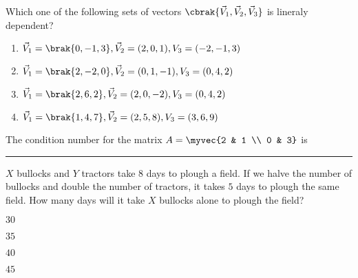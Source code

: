     \item Which one of the following sets of vectors $\cbrak{\vec{V}_1,\vec{V}_2,\vec{V}_3}$ is lineraly dependent?
                \begin{enumerate}
                        \item $\vec{V}_1 = \brak{0,-1,3}, \vec{V}_2 = (2,0,1), V_3 =(-2,-1,3)$
                        \item $\vec{V}_1 = \brak{2,-2,0}, \vec{V}_2 = (0,1,-1), V_3 =(0,4,2)$
                        \item $\vec{V}_1 = \brak{2,6,2}, \vec{V}_2 = (2,0,-2), V_3 =(0,4,2)$
                        \item $\vec{V}_1 = \brak{1,4,7}, \vec{V}_2 = (2,5,8), V_3 =(3,6,9)$
                \end{enumerate}
	    \hfill{}
    
    \item The condition number for the matrix $A = \myvec{2 & 1 \\ 0 & 3}$ is \rule{3cm}{0.15mm}  \hfill{}
    
                
    \item $X$ bullocks and $Y$ tractors take $8$ days to plough a field. If we halve the number of bullocks and double the number of tractors, it takes $5$ days to plough the same field. How many days will it take $X$ bullocks alone to plough the field? \hfill{}
        \begin{enumerate}
            \begin{multicols}{4}
                \item $30$
                \item $35$
                \item $40$
                \item $45$
            \end{multicols}
        \end{enumerate}
        
